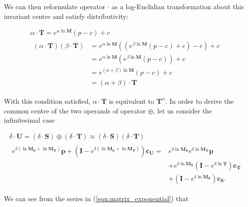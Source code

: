         We can then reformulate operator $\cdot$ as a log-Euclidian transformation about this invariant centre and satisfy distributivity:
        
        \begin{gather}
          \alpha \cdot \mathbf{T} = e^{\alpha\ln\mathbf{M}}(p - c) + c \label{eqn:affine_cdot} \\
          \begin{split}
            (\alpha \cdot \mathbf{T})(\beta \cdot \mathbf{T}) &= e^{\alpha\ln\mathbf{M}}((e^{\beta\ln\mathbf{M}}(p - c) + c) - c) + c \\
                                                              &= e^{\alpha\ln\mathbf{M}}(e^{\beta\ln\mathbf{M}}(p - c)) + c \\
                                                              &= e^{(\alpha + \beta)\ln\mathbf{M}}(p - c) + c \\
                                                              &= (\alpha + \beta) \cdot \mathbf{T}
          \end{split}
        \end{gather}
        
        With this condition satisfied, $\alpha\cdot\mathbf{T}$ is equivalent to $\mathbf{T}^{\alpha}$. In order to derive the common centre of the two operands of operator $\oplus$, let us consider the infinitesimal case
        
        \begin{gather}
          \delta \cdot \mathbf{U} = (\delta \cdot \mathbf{S}) \oplus (\delta \cdot \mathbf{T}) \approx (\delta \cdot \mathbf{S}) (\delta \cdot \mathbf{T}) \\
          \begin{split}
            e^{\delta(\ln \mathbf{M_S} + \ln \mathbf{M_T})}\mathbf{p} + (\mathbf{I} - e^{\delta(\ln \mathbf{M_S} + \ln \mathbf{M_T})})\mathbf{c_U} =
              &e^{\delta \ln \mathbf{M_S}}e^{\delta \ln \mathbf{M_T}}\mathbf{p} \\
              &+ e^{\delta \ln \mathbf{M_S}}(\mathbf{I} - e^{\delta \ln \mathbf{T}})\mathbf{c_T} \\
              &+ (\mathbf{I} - e^{\delta \ln \mathbf{M_S}})\mathbf{c_S}. \label{eqn:infinitesimal_oplus}
          \end{split}
        \end{gather}
        
        We can see from the series in (\ref{eqn:matrix_exponential}) that
        
